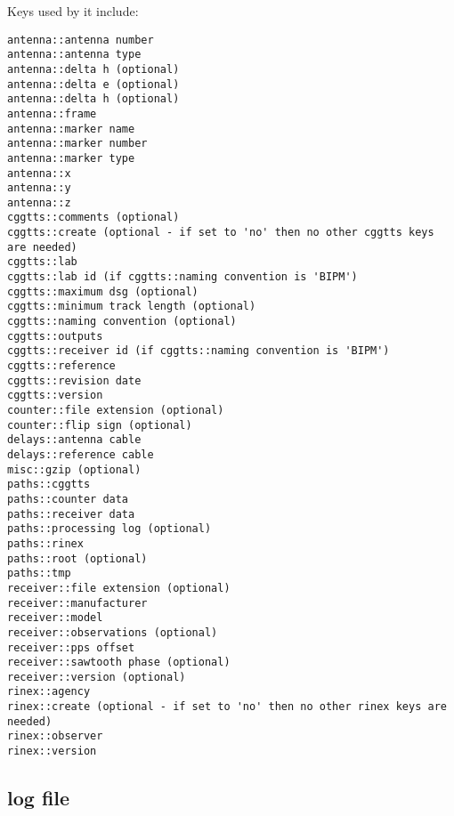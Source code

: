 Keys used by it include:
\begin{lstlisting}
antenna::antenna number
antenna::antenna type
antenna::delta h (optional)
antenna::delta e (optional)
antenna::delta h (optional)
antenna::frame
antenna::marker name
antenna::marker number
antenna::marker type
antenna::x
antenna::y
antenna::z
cggtts::comments (optional)
cggtts::create (optional - if set to 'no' then no other cggtts keys are needed)
cggtts::lab
cggtts::lab id (if cggtts::naming convention is 'BIPM')
cggtts::maximum dsg (optional)
cggtts::minimum track length (optional)
cggtts::naming convention (optional)
cggtts::outputs
cggtts::receiver id (if cggtts::naming convention is 'BIPM')
cggtts::reference
cggtts::revision date
cggtts::version
counter::file extension (optional)
counter::flip sign (optional)
delays::antenna cable
delays::reference cable
misc::gzip (optional)
paths::cggtts
paths::counter data
paths::receiver data
paths::processing log (optional)
paths::rinex
paths::root (optional)
paths::tmp
receiver::file extension (optional)
receiver::manufacturer
receiver::model
receiver::observations (optional)
receiver::pps offset
receiver::sawtooth phase (optional)
receiver::version (optional)
rinex::agency
rinex::create (optional - if set to 'no' then no other rinex keys are needed)
rinex::observer
rinex::version
\end{lstlisting}

\subsection{log file}
